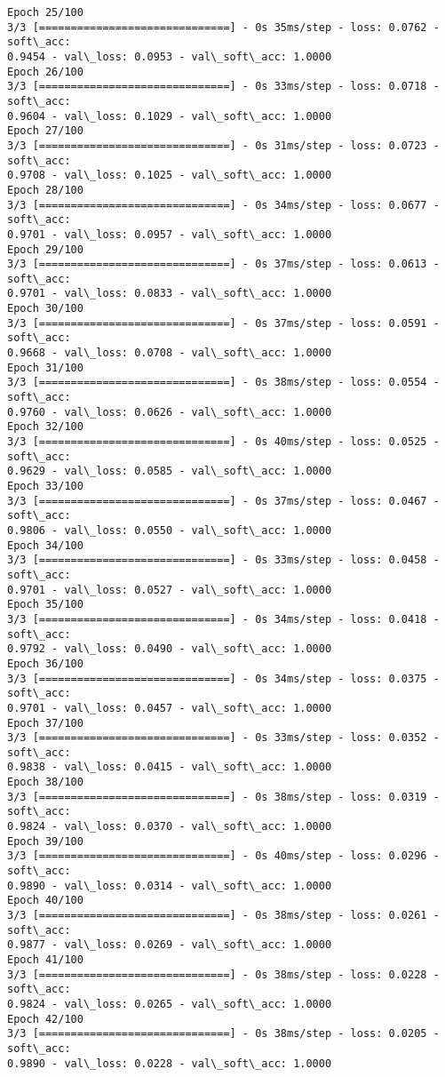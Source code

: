 \documentclass[11pt]{article}
\begin{document}
\begin{Verbatim}[commandchars=\\\{\}]
Epoch 25/100
3/3 [==============================] - 0s 35ms/step - loss: 0.0762 - soft\_acc:
0.9454 - val\_loss: 0.0953 - val\_soft\_acc: 1.0000
Epoch 26/100
3/3 [==============================] - 0s 33ms/step - loss: 0.0718 - soft\_acc:
0.9604 - val\_loss: 0.1029 - val\_soft\_acc: 1.0000
Epoch 27/100
3/3 [==============================] - 0s 31ms/step - loss: 0.0723 - soft\_acc:
0.9708 - val\_loss: 0.1025 - val\_soft\_acc: 1.0000
Epoch 28/100
3/3 [==============================] - 0s 34ms/step - loss: 0.0677 - soft\_acc:
0.9701 - val\_loss: 0.0957 - val\_soft\_acc: 1.0000
Epoch 29/100
3/3 [==============================] - 0s 37ms/step - loss: 0.0613 - soft\_acc:
0.9701 - val\_loss: 0.0833 - val\_soft\_acc: 1.0000
Epoch 30/100
3/3 [==============================] - 0s 37ms/step - loss: 0.0591 - soft\_acc:
0.9668 - val\_loss: 0.0708 - val\_soft\_acc: 1.0000
Epoch 31/100
3/3 [==============================] - 0s 38ms/step - loss: 0.0554 - soft\_acc:
0.9760 - val\_loss: 0.0626 - val\_soft\_acc: 1.0000
Epoch 32/100
3/3 [==============================] - 0s 40ms/step - loss: 0.0525 - soft\_acc:
0.9629 - val\_loss: 0.0585 - val\_soft\_acc: 1.0000
Epoch 33/100
3/3 [==============================] - 0s 37ms/step - loss: 0.0467 - soft\_acc:
0.9806 - val\_loss: 0.0550 - val\_soft\_acc: 1.0000
Epoch 34/100
3/3 [==============================] - 0s 33ms/step - loss: 0.0458 - soft\_acc:
0.9701 - val\_loss: 0.0527 - val\_soft\_acc: 1.0000
Epoch 35/100
3/3 [==============================] - 0s 34ms/step - loss: 0.0418 - soft\_acc:
0.9792 - val\_loss: 0.0490 - val\_soft\_acc: 1.0000
Epoch 36/100
3/3 [==============================] - 0s 34ms/step - loss: 0.0375 - soft\_acc:
0.9701 - val\_loss: 0.0457 - val\_soft\_acc: 1.0000
Epoch 37/100
3/3 [==============================] - 0s 33ms/step - loss: 0.0352 - soft\_acc:
0.9838 - val\_loss: 0.0415 - val\_soft\_acc: 1.0000
Epoch 38/100
3/3 [==============================] - 0s 38ms/step - loss: 0.0319 - soft\_acc:
0.9824 - val\_loss: 0.0370 - val\_soft\_acc: 1.0000
Epoch 39/100
3/3 [==============================] - 0s 40ms/step - loss: 0.0296 - soft\_acc:
0.9890 - val\_loss: 0.0314 - val\_soft\_acc: 1.0000
Epoch 40/100
3/3 [==============================] - 0s 38ms/step - loss: 0.0261 - soft\_acc:
0.9877 - val\_loss: 0.0269 - val\_soft\_acc: 1.0000
Epoch 41/100
3/3 [==============================] - 0s 38ms/step - loss: 0.0228 - soft\_acc:
0.9824 - val\_loss: 0.0265 - val\_soft\_acc: 1.0000
Epoch 42/100
3/3 [==============================] - 0s 38ms/step - loss: 0.0205 - soft\_acc:
0.9890 - val\_loss: 0.0228 - val\_soft\_acc: 1.0000

\end{Verbatim}
\end{document}
